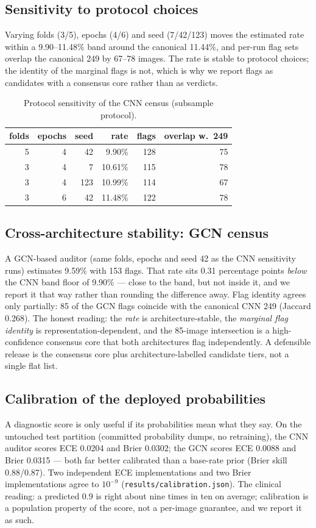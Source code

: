 \subsection{Sensitivity to protocol choices}
Varying folds (3/5), epochs (4/6) and seed (7/42/123) moves the estimated
rate within a 9.90--11.48\% band around the canonical
11.44\%, and per-run flag sets overlap the canonical 249 by
67--78 images. The rate is stable to protocol choices; the identity of the
marginal flags is not, which is why we report flags as candidates with a
consensus core rather than as verdicts.
\begin{table}[h]
\centering\small
\caption{Protocol sensitivity of the CNN census (subsample protocol).}
\label{tab:sensitivity}
\begin{tabular}{r r r r r r}
\hline
folds & epochs & seed & rate & flags & overlap w.\ 249 \\ \hline
5 & 4 & 42 & 9.90\% & 128 & 75 \\
3 & 4 & 7 & 10.61\% & 115 & 78 \\
3 & 4 & 123 & 10.99\% & 114 & 67 \\
3 & 6 & 42 & 11.48\% & 122 & 78 \\
\hline
\end{tabular}
\end{table}

\subsection{Cross-architecture stability: GCN census}
A GCN-based auditor (same folds, epochs and seed 42 as the CNN sensitivity
runs) estimates 9.59\% with
153 flags. That rate sits 0.31 percentage points
\emph{below} the CNN band floor of 9.90\% --- close to the band, but
not inside it, and we report it that way rather than rounding the
difference away. Flag identity agrees only partially:
85 of the GCN flags coincide with the canonical
CNN 249 (Jaccard 0.268). The honest reading:
the \emph{rate} is architecture-stable, the \emph{marginal flag
identity} is representation-dependent, and the
85-image intersection is a high-confidence
consensus core that both architectures flag independently. A defensible
release is the consensus core plus architecture-labelled candidate tiers,
not a single flat list.

\subsection{Calibration of the deployed probabilities}
\label{sec:calibration}
A diagnostic score is only useful if its probabilities mean what they say.
On the untouched test partition (committed probability dumps, no
retraining), the CNN auditor scores ECE 0.0204 and
Brier 0.0302; the GCN scores ECE 0.0088 and Brier
0.0315 --- both far better calibrated than a base-rate prior
(Brier skill 0.88/0.87). Two independent ECE
implementations and two Brier implementations agree to $10^{-9}$
(\texttt{results/calibration.json}). The clinical reading: a predicted
0.9 is right about nine times in ten on average; calibration is a
population property of the score, not a per-image guarantee, and we report
it as such.


